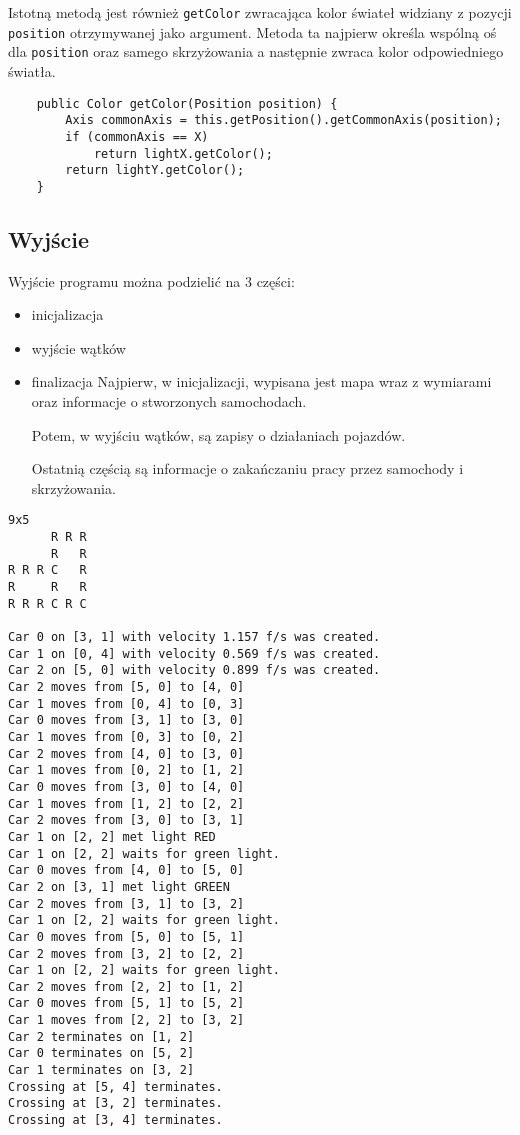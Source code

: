 \documentclass[a4paper]{article}
\begin{document}
Istotną metodą jest również \verb+getColor+ zwracająca kolor świateł widziany z pozycji \verb+position+ otrzymywanej jako argument. Metoda ta najpierw określa wspólną oś dla \verb+position+ oraz samego skrzyżowania a	 następnie zwraca kolor odpowiedniego światła.
\begin{verbatim}
    public Color getColor(Position position) {
        Axis commonAxis = this.getPosition().getCommonAxis(position);
        if (commonAxis == X)
            return lightX.getColor();
        return lightY.getColor();
    }
\end{verbatim}

\subsection{Wyjście}
Wyjście programu można podzielić na 3 części:
\begin{itemize}
\item inicjalizacja
\item wyjście wątków
\item finalizacja
Najpierw, w inicjalizacji, wypisana jest mapa wraz z wymiarami oraz informacje o stworzonych samochodach.

Potem, w wyjściu wątków, są zapisy o działaniach pojazdów.

Ostatnią częścią są informacje o zakańczaniu pracy przez samochody i skrzyżowania.
\end{itemize}
\begin{verbatim}
9x5
      R R R       
      R   R       
R R R C   R       
R     R   R       
R R R C R C       

Car 0 on [3, 1] with velocity 1.157 f/s was created.
Car 1 on [0, 4] with velocity 0.569 f/s was created.
Car 2 on [5, 0] with velocity 0.899 f/s was created.
Car 2 moves from [5, 0] to [4, 0]
Car 1 moves from [0, 4] to [0, 3]
Car 0 moves from [3, 1] to [3, 0]
Car 1 moves from [0, 3] to [0, 2]
Car 2 moves from [4, 0] to [3, 0]
Car 1 moves from [0, 2] to [1, 2]
Car 0 moves from [3, 0] to [4, 0]
Car 1 moves from [1, 2] to [2, 2]
Car 2 moves from [3, 0] to [3, 1]
Car 1 on [2, 2] met light RED
Car 1 on [2, 2] waits for green light.
Car 0 moves from [4, 0] to [5, 0]
Car 2 on [3, 1] met light GREEN
Car 2 moves from [3, 1] to [3, 2]
Car 1 on [2, 2] waits for green light.
Car 0 moves from [5, 0] to [5, 1]
Car 2 moves from [3, 2] to [2, 2]
Car 1 on [2, 2] waits for green light.
Car 2 moves from [2, 2] to [1, 2]
Car 0 moves from [5, 1] to [5, 2]
Car 1 moves from [2, 2] to [3, 2]
Car 2 terminates on [1, 2]
Car 0 terminates on [5, 2]
Car 1 terminates on [3, 2]
Crossing at [5, 4] terminates.
Crossing at [3, 2] terminates.
Crossing at [3, 4] terminates.
\end{verbatim}
\end{document}
